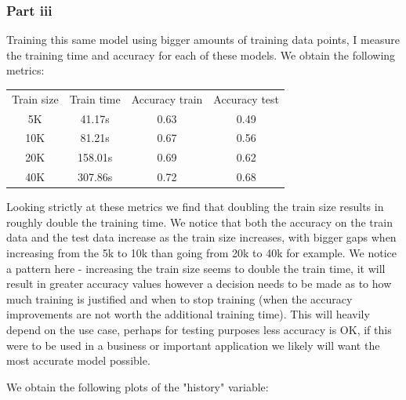 \documentclass[10pt]{article}
\begin{document}
\subsubsection*{Part iii}
Training this same model using bigger amounts of training data
points, I measure the training time and accuracy for each of these
models. We obtain the following metrics:

\vspace{5mm} %
\begin{center} \begin{tabular}[h]{cccc}
    Train size & Train time & Accuracy train & Accuracy test  \\
    5K         & 41.17s     & 0.63           & 0.49            \\
    10K        & 81.21s     & 0.67           & 0.56            \\
    20K        & 158.01s    & 0.69           & 0.62            \\   
    40K        & 307.86s    & 0.72           & 0.68            \\
\end{tabular} \end{center}

Looking strictly at these metrics we find that doubling the train size
results in roughly double the training time. We notice that both the
accuracy on the train data and the test data increase as the train size increases,
with bigger gaps when increasing from the 5k to 10k than going from 20k to 40k for
example. We notice a pattern here - increasing the train size seems to double the train time,
it will result in greater accuracy values however a decision needs to be made as to
how much training is justified and when to stop training (when the accuracy improvements are
not worth the additional training time). This will heavily depend on the use case, 
perhaps for testing purposes less accuracy is OK, if this were to be used in a business
or important application we likely will want the most accurate model possible.

We obtain the following plots of the "history" variable: 
\end{document}
